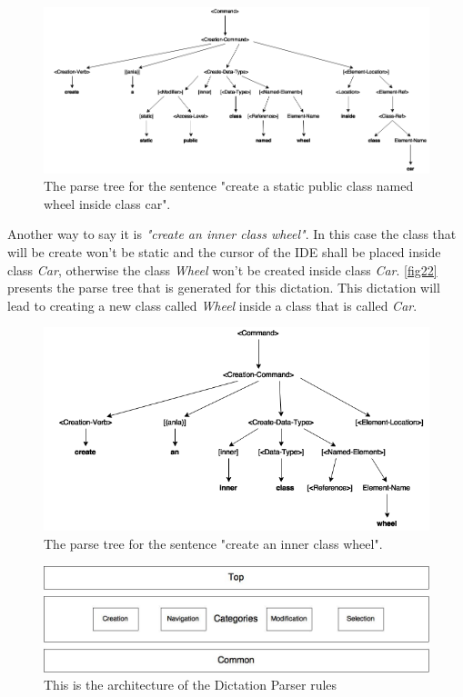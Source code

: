 \begin{figure}[H]
\centering
\includegraphics[scale=0.4]{"./fig/Parse Tree create a static public class named wheel inside class car"}
\caption{The parse tree for the sentence "create a static public class named wheel inside class car".}
\label{fig21}
\end{figure}

Another way to say it is \textit{"create an inner class wheel"}. In this case the class that will be create won't be static and the cursor of the IDE shall be placed inside class \textit{Car}, otherwise the class \textit{Wheel} won't be created inside class \textit{Car}. \autoref{fig22} presents the parse tree that is generated for this dictation. This dictation will lead to creating a new class called \textit{Wheel} inside a class that is called \textit{Car}.

\begin{figure}[H]
\centering
\includegraphics[scale=0.4]{"./fig/Parse Tree create an inner class wheel"}
\caption{The parse tree for the sentence "create an inner class wheel".}
\label{fig22}
\end{figure}

\begin{figure}[H]
\centering
\includegraphics[scale=0.4]{./fig/BNFDiagram}
\caption{This is the architecture of the Dictation Parser rules}
\label{fig19}
\end{figure}

